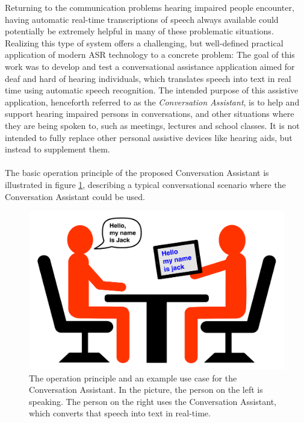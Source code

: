 \documentclass[english, 12pt, a4paper, pdftex, elec, utf8]{aaltothesis}
\begin{document}
Returning to the communication problems hearing impaired people encounter, having automatic real-time transcriptions of speech always available could potentially be extremely helpful in many of these problematic situations. Realizing this type of system offers a challenging, but well-defined practical application of modern ASR technology to a concrete problem: The goal of this work was to develop and test a conversational assistance application aimed for deaf and hard of hearing individuals, which translates speech into text in real time using automatic speech recognition. The intended purpose of this assistive application, henceforth referred to as the \textit{Conversation Assistant}, is to help and support hearing impaired persons in conversations, and other situations where they are being spoken to, such as meetings, lectures and school classes. It is not intended to fully replace other personal assistive devices like hearing aids, but instead to supplement them. \\\\
The basic operation principle of the proposed Conversation Assistant is illustrated in figure \ref{fig:assistant}, describing a typical conversational scenario where the Conversation Assistant could be used. 
\begin{figure}[b]
	\centering 
	\includegraphics[trim={0cm 0cm 0cm 0cm}, clip, width=\textwidth]{assistant3.pdf}
	\caption{The operation principle and an example use case for the Conversation Assistant. In the picture, the person on the left is speaking. The person on the right uses the Conversation Assistant, which converts that speech into text in real-time.}
	\label{fig:assistant} 
\end{figure} 
\end{document}
